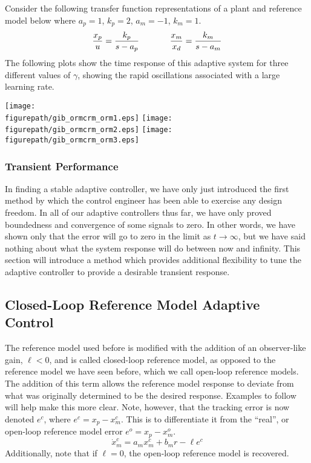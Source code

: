 \begin{example}
  Consider the following transfer function representations of a plant and reference model below where $a_{p}=1$, $k_{p}=2$, $a_{m}=-1$, $k_{m}=1$.
  \begin{equation*}
    \frac{x_{p}}{u}=\frac{k_{p}}{s-a_{p}}
    \hspace{0.5in}
    \frac{x_{m}}{x_{d}}=\frac{k_{m}}{s-a_{m}}
  \end{equation*}
  The following plots show the time response of this adaptive system for three different values of $\gamma$, showing the rapid oscillations associated with a large learning rate.
  \begin{center}
    \texttt{[image: \\figurepath/gib\_ormcrm\_orm1.eps]}
    \texttt{[image: \\figurepath/gib\_ormcrm\_orm2.eps]}
    \texttt{[image: \\figurepath/gib\_ormcrm\_orm3.eps]}
  \end{center}
\end{example}

\subsubsection{Transient Performance}

In finding a stable adaptive controller, we have only just introduced the first method by which the control engineer has been able to exercise any design freedom.
In all of our adaptive controllers thus far, we have only proved boundedness and convergence of some signals to zero.
In other words, we have shown only that the error will go to zero in the limit as $t\rightarrow\infty$, but we have said nothing about what the system response will do between now and infinity.
This section will introduce a method which provides additional flexibility to tune the adaptive controller to provide a desirable transient response.

\subsection{Closed-Loop Reference Model Adaptive Control}

The reference model used before is modified with the addition of an observer-like gain, $\ell<0$, and is called closed-loop reference model, as opposed to the reference model we have seen before, which we call open-loop reference models.
The addition of this term allows the reference model response to deviate from what was originally determined to be the desired response.
Examples to follow will help make this more clear.
Note, however, that the tracking error is now denoted $e^{c}$, where $e^{c}=x_{p}-x_{m}^{c}$.
This is to differentiate it from the ``real'', or open-loop reference model error $e^{o}=x_{p}-x_{m}^{o}$.
\begin{equation*}
  \dot{x}_{m}^{c}=a_{m}x_{m}^{c}+b_{m}r-\ell e^{c}
\end{equation*}
Additionally, note that if $\ell=0$, the open-loop reference model is recovered.

